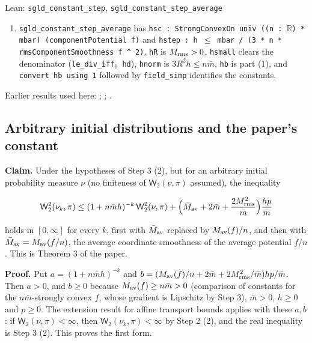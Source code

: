 \documentclass[11pt,a4paper]{report}
\begin{document}
\begin{leanbox}{Lean: \texttt{sgld\_\allowbreak{}constant\_\allowbreak{}step}, \texttt{sgld\_\allowbreak{}constant\_\allowbreak{}step\_\allowbreak{}average}}
\begin{enumerate}
\item \texttt{sgld\_\allowbreak{}constant\_\allowbreak{}step\_\allowbreak{}average} has \texttt{hsc : Strong\allowbreak{}Convex\allowbreak{}On univ ((n : \ensuremath{\mathbb R}) * mbar) (component\allowbreak{}Potential f)} and \texttt{hstep : h \ensuremath{\le} mbar /\allowbreak{} (3 * n * rms\allowbreak{}Component\allowbreak{}Smoothness f \textasciicircum{} 2)}. \texttt{h\allowbreak{}R} is \(M_{\rm rms}>0\), \texttt{hsmall} clears the denominator (\texttt{le\_\allowbreak{}div\_\allowbreak{}iff\ensuremath{{}_{0}} hd}), \texttt{hnorm} is \(3R^2h\le n\bar m\), \texttt{hb} is part (1), and \texttt{convert hb using 1} followed by \texttt{field\_\allowbreak{}simp} identifies the constants.

\end{enumerate}
\end{leanbox}


Earlier results used here: \cite[Section~3.17.3]{LangevinLean2026ULASC}; \cite[Section~3.17.4]{LangevinLean2026ULASC}; \cite[Section~3.26.3]{LangevinLean2026ULASC}.
\subsection{\texorpdfstring{Arbitrary initial distributions and the paper's constant}{Arbitrary initial distributions and the paper's constant}}
\label{report-step-AverageLMC-SGLDTheorem-lean-4}


\textbf{Claim.} Under the hypotheses of Step 3 (2), but for an arbitrary initial probability measure \(\nu\) (no finiteness of \(\mathsf W_2(\nu,\pi)\) assumed), the inequality


\[\mathsf W_2^2(\nu_k,\pi)\le(1+n\bar mh)^{-k}\,\mathsf W_2^2(\nu,\pi)+\Bigl(\bar M_{\rm av}+2\bar m+\frac{2M_{\rm rms}^2}{\bar m}\Bigr)\frac{hp}{\bar m}\]


holds in \([0,\infty]\) for every \(k\), first with \(\bar M_{\rm av}\) replaced by \(M_{\rm av}(f)/n\), and then with \(\bar M_{\rm av}=M_{\rm av}(f/n)\), the average coordinate smoothness of the average potential \(f/n\). This is Theorem 3 of the paper.




\textbf{Proof.} Put \(a=(1+n\bar mh)^{-k}\) and \(b=(M_{\rm av}(f)/n+2\bar m+2M_{\rm rms}^2/\bar m)hp/\bar m\). Then \(a>0\), and \(b\ge0\) because \(M_{\rm av}(f)\ge n\bar m>0\) (comparison of constants for the \(n\bar m\)-strongly convex \(f\), whose gradient is Lipschitz by Step 3), \(\bar m>0\), \(h\ge0\) and \(p\ge0\). The extension result for affine transport bounds applies with these \(a,b\): if \(\mathsf W_2(\nu,\pi)<\infty\), then \(\mathsf W_2(\nu_k,\pi)<\infty\) by Step 2 (2), and the real inequality is Step 3 (2). This proves the first form.
\end{document}
